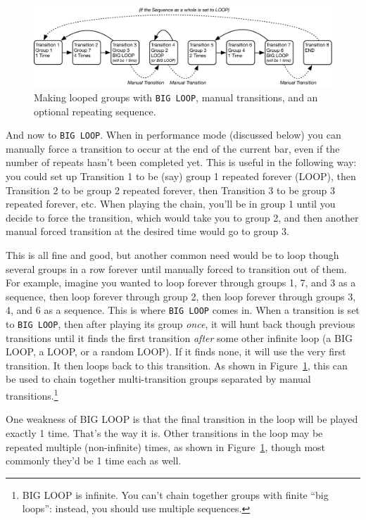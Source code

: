 \documentclass{article}
\begin{document}
\begin{figure}[t]
\centering\includegraphics[width=6.5in]{BigLoop}
\caption{Making looped groups with {\tt BIG LOOP}, manual transitions, and an optional repeating sequence.}
\vspace{-1em}
\label{bigloop}
\end{figure}

And now to {\tt BIG LOOP}.  When in performance mode (discussed below) you can manually force a transition to occur at the end of the current bar, even if the number of repeats hasn't been completed yet.  This is useful in the following way: you could set up Transition 1 to be (say) group 1 repeated forever (LOOP), then Transition 2 to be group 2 repeated forever, then Transition 3 to be group 3 repeated forever, etc.  When playing the chain, you'll be in group 1 until you decide to force the transition, which would take you to group 2, and then another manual forced transition at the desired time would go to group 3.

This is all fine and good, but another common need would be to loop though several groups in a row forever until manually forced to transition out of them.  For example, imagine you wanted to loop forever through groups 1, 7, and 3 as a sequence, then loop forever through group 2, then loop forever through groups 3, 4, and 6 as a sequence.  This is where {\tt BIG LOOP} comes in.  When a transition is set to {\tt BIG LOOP}, then after playing its group {\it once}, it will hunt back though previous transitions until it finds the first transition {\it after} some other infinite loop (a BIG LOOP, a LOOP, or a random LOOP).  If it finds none, it will use the very first transition.  It then loops back to this transition.  As shown in Figure~\ref{bigloop}, this can be used to chain together multi-transition groups separated by manual transitions.\footnote{BIG LOOP is infinite.  You can't chain together groups with finite ``big loops'': instead, you should use multiple sequences.}

One weakness of BIG LOOP is that the final transition in the loop will be played exactly 1 time.  That's the way it is.  Other transitions in the loop may be repeated multiple (non-infinite) times, as shown in Figure~\ref{bigloop}, though most commonly they'd be 1 time each as well.
\end{document}

